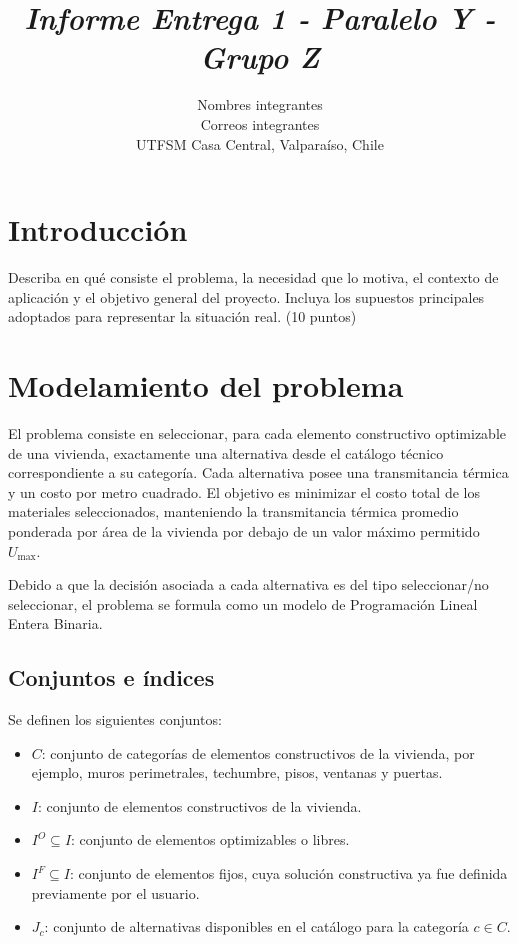 \documentclass[journal, 12pt, onecolumn]{IEEEtran}
\begin{document}
\title{\textit{Informe Entrega 1 - Paralelo Y - Grupo Z}}
\author{Nombres integrantes \\ 
Correos integrantes \\
UTFSM Casa Central, Valparaíso, Chile}
\maketitle

\section{Introducción}
Describa en qué consiste el problema, la necesidad que lo motiva, el contexto de
aplicación y el objetivo general del proyecto. Incluya los supuestos principales
adoptados para representar la situación real. (10 puntos)

\section{Modelamiento del problema}

El problema consiste en seleccionar, para cada elemento constructivo optimizable
de una vivienda, exactamente una alternativa desde el catálogo técnico
correspondiente a su categoría. Cada alternativa posee una transmitancia
térmica y un costo por metro cuadrado. El objetivo es minimizar el costo total
de los materiales seleccionados, manteniendo la transmitancia térmica promedio
ponderada por área de la vivienda por debajo de un valor máximo permitido
$U_{\max}$.

Debido a que la decisión asociada a cada alternativa es del tipo
seleccionar/no seleccionar, el problema se formula como un modelo de
Programación Lineal Entera Binaria.

\subsection{Conjuntos e índices}

Se definen los siguientes conjuntos:

\begin{itemize}
    \item $C$: conjunto de categorías de elementos constructivos de la vivienda,
    por ejemplo, muros perimetrales, techumbre, pisos, ventanas y puertas.
    \item $I$: conjunto de elementos constructivos de la vivienda.
    \item $I^{O} \subseteq I$: conjunto de elementos optimizables o libres.
    \item $I^{F} \subseteq I$: conjunto de elementos fijos, cuya solución
    constructiva ya fue definida previamente por el usuario.
    \item $J_c$: conjunto de alternativas disponibles en el catálogo para la
    categoría $c \in C$.
\end{itemize}
\end{document}
